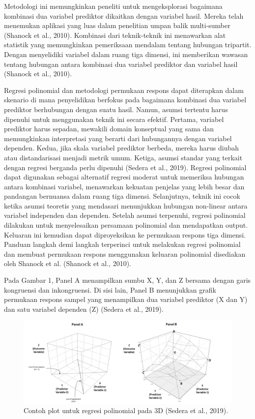 Metodologi ini memungkinkan peneliti untuk mengeksplorasi bagaimana kombinasi dua variabel prediktor dikaitkan dengan variabel hasil. Mereka telah menemukan aplikasi yang luas dalam penelitian umpan balik multi-sumber (Shanock et al., 2010). Kombinasi dari teknik-teknik ini menawarkan alat statistik yang memungkinkan pemeriksaan mendalam tentang hubungan tripartit. Dengan menyelidiki variabel dalam ruang tiga dimensi, ini memberikan wawasan tentang hubungan antara kombinasi dua variabel prediktor dan variabel hasil (Shanock et al., 2010).

Regresi polinomial dan metodologi permukaan respons dapat diterapkan dalam skenario di mana penyelidikan berfokus pada bagaimana kombinasi dua variabel prediktor berhubungan dengan suatu hasil. Namun, asumsi tertentu harus dipenuhi untuk menggunakan teknik ini secara efektif. Pertama, variabel prediktor harus sepadan, mewakili domain konseptual yang sama dan memungkinkan interpretasi yang berarti dari hubungannya dengan variabel dependen. Kedua, jika skala variabel prediktor berbeda, mereka harus diubah atau distandarisasi menjadi metrik umum. Ketiga, asumsi standar yang terkait dengan regresi berganda perlu dipenuhi (Sedera et al., 2019). Regresi polinomial dapat digunakan sebagai alternatif regresi moderat untuk memeriksa hubungan antara kombinasi variabel, menawarkan kekuatan penjelas yang lebih besar dan pandangan bernuansa dalam ruang tiga dimensi. Selanjutnya, teknik ini cocok ketika asumsi teoretis yang mendasari menunjukkan hubungan non-linear antara variabel independen dan dependen. Setelah asumsi terpenuhi, regresi polinomial dilakukan untuk menyelesaikan persamaan polinomial dan mendapatkan output. Keluaran ini kemudian dapat diproyeksikan ke permukaan respons tiga dimensi. Panduan langkah demi langkah terperinci untuk melakukan regresi polinomial dan membuat permukaan respons menggunakan keluaran polinomial disediakan oleh Shanock et al. (Shanock et al., 2010).

Pada Gambar 1, Panel A menampilkan sumbu X, Y, dan Z bersama dengan garis kongruensi dan inkongruensi. Di sisi lain, Panel B menunjukkan grafik permukaan respons sampel yang menampilkan dua variabel prediktor (X dan Y) dan satu variabel dependen (Z) (Sedera et al., 2019).

\begin{figure}[H]
  \centering
  \includegraphics[scale=1]{gambar/plotregresipoli.png}
  \caption{Contoh plot untuk regresi polinomial pada 3D (Sedera et al., 2019).}
  \label{fig:plotregresipoli}
\end{figure}

